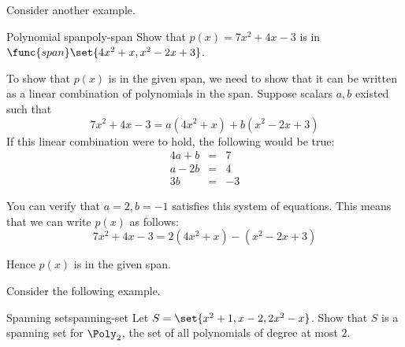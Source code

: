 Consider another example. 

\begin{example}{Polynomial span}{poly-span}
Show that $p(x) = 7x^2 + 4x - 3$ is in $\func{span}\set{4x^2 + x, x^2 -2x + 3 }$. 
\end{example}

\begin{solution}
To show that $p(x)$ is in the given span, we need to show that it can be written as a linear combination of polynomials in the span. Suppose scalars $a, b$ existed such that 
\[
7x^2 +4x - 3= a(4x^2+x) + b (x^2-2x+3) 
\]
If this linear combination were to hold, the following would be true:
\begin{eqnarray*}
4a + b &=& 7 \\
a - 2b &=& 4 \\
3b &=& -3 
\end{eqnarray*}

You can verify that $a = 2, b = -1$ satisfies this system of equations. This means that we can write $p(x)$ as follows:
\[
 7x^2 +4x-3= 2(4x^2+x)  - (x^2-2x+3) 
\]

Hence $p(x)$ is in the given span.
\end{solution}

Consider the following example.

\begin{example}{Spanning set}{spanning-set}
Let $S = \set{x^2 + 1, x-2, 2x^2 - x }$. Show that $S$ is a spanning set for $\Poly_2$, the set of all polynomials of degree at most $2$. 
\end{example}

